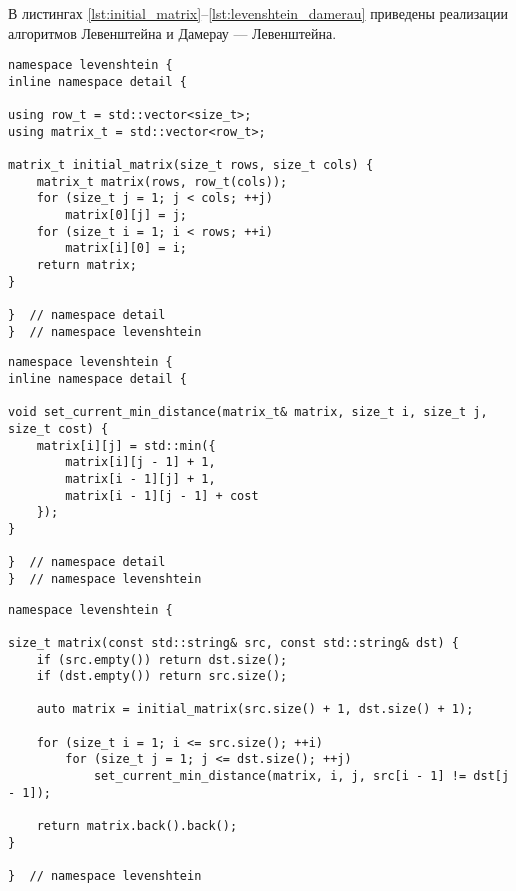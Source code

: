 В листингах \ref{lst:initial_matrix}--\ref{lst:levenshtein_damerau} приведены реализации алгоритмов Левенштейна и Дамерау — Левенштейна.

\begin{lstlisting}[caption={Функция, создающая матрицу с инициализированными первой строкой и первым столбцом},label={lst:initial_matrix},style={cpp}]
namespace levenshtein {
inline namespace detail {

using row_t = std::vector<size_t>;
using matrix_t = std::vector<row_t>;

matrix_t initial_matrix(size_t rows, size_t cols) {
	matrix_t matrix(rows, row_t(cols));
	for (size_t j = 1; j < cols; ++j)
		matrix[0][j] = j;
	for (size_t i = 1; i < rows; ++i)
		matrix[i][0] = i;
	return matrix;
}

}  // namespace detail
}  // namespace levenshtein
\end{lstlisting}

\begin{lstlisting}[caption={Процедура, вычисляющая текущее расстояние},label={lst:set_current_min_distance},style={cpp}]
namespace levenshtein {
inline namespace detail {

void set_current_min_distance(matrix_t& matrix, size_t i, size_t j, size_t cost) {
	matrix[i][j] = std::min({
		matrix[i][j - 1] + 1,
		matrix[i - 1][j] + 1,
		matrix[i - 1][j - 1] + cost
	});
}

}  // namespace detail
}  // namespace levenshtein
\end{lstlisting}

\begin{lstlisting}[caption={Функция, реализующая матричный алгоритм Левенштейна},label={lst:levenshtein_matrix},style={cpp}]
namespace levenshtein {

size_t matrix(const std::string& src, const std::string& dst) {
	if (src.empty()) return dst.size();
	if (dst.empty()) return src.size();

	auto matrix = initial_matrix(src.size() + 1, dst.size() + 1);

	for (size_t i = 1; i <= src.size(); ++i)
		for (size_t j = 1; j <= dst.size(); ++j)
			set_current_min_distance(matrix, i, j, src[i - 1] != dst[j - 1]);

	return matrix.back().back();
}

}  // namespace levenshtein

\end{lstlisting}


